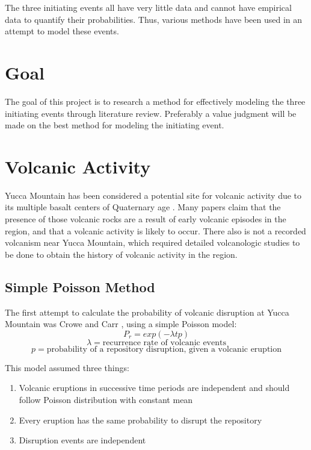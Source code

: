 \documentclass[12pt]{article}
\begin{document}
The three initiating events all have very little data
and cannot have empirical data to quantify their probabilities. Thus,
various methods have been used in an attempt to model these events.

\section{Goal}
The goal of this project is to research a method for effectively
modeling the three initiating events through literature review.
Preferably a value judgment will be made on the best method
for modeling the initiating event. 


\section{Volcanic Activity}
Yucca Mountain has been considered a potential site
for volcanic activity due to its multiple basalt centers 
of Quaternary age \cite{management_environmental_1986}.
Many papers \cite{crowe_volcanism:_2006, crowe_status_1995}claim that
the presence of those volcanic rocks are a result of early volcanic episodes in the region,
and that a volcanic activity is likely to occur.
There also is not a recorded volcanism near Yucca Mountain, which required
detailed volcanologic studies to be done to obtain the history of 
volcanic activity in the region.

\subsection{Simple Poisson Method}
The first attempt to calculate the probability of volcanic disruption
at Yucca Mountain was Crowe and Carr \cite{crowe_preliminary_1980}, using 
a simple Poisson model:
\[P_r = exp(-\lambda t p)\]
\[\lambda = \text{recurrence rate of volcanic events}\]
\[p = \text{probability of a repository disruption, given a volcanic eruption}\]

This model assumed three things:

\begin{enumerate}
    \item Volcanic eruptions in successive time periods are independent
     and should follow Poisson distribution with constant mean\\
    \item Every eruption has the same probability to disrupt the repository \\
    \item Disruption events are independent \\
\end{enumerate}
\end{document}
